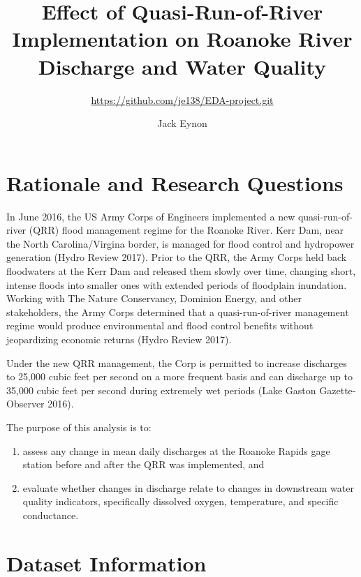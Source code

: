 \documentclass[12pt,]{article}
\title{Effect of Quasi-Run-of-River Implementation on Roanoke River Discharge
and Water Quality}
\subtitle{\url{https://github.com/je138/EDA-project.git}}
\author{Jack Eynon}
\date{}
\begin{document}
\maketitle

\newpage
\tableofcontents 
\newpage
\listoftables 
\newpage
\listoffigures 
\newpage

\hypertarget{rationale-and-research-questions}{%
\section{Rationale and Research
Questions}\label{rationale-and-research-questions}}

In June 2016, the US Army Corps of Engineers implemented a new
quasi-run-of-river (QRR) flood management regime for the Roanoke River.
Kerr Dam, near the North Carolina/Virgina border, is managed for flood
control and hydropower generation (Hydro Review 2017). Prior to the QRR,
the Army Corps held back floodwaters at the Kerr Dam and released them
slowly over time, changing short, intense floods into smaller ones with
extended periods of floodplain inundation. Working with The Nature
Conservancy, Dominion Energy, and other stakeholders, the Army Corps
determined that a quasi-run-of-river management regime would produce
environmental and flood control benefits without jeopardizing economic
returns (Hydro Review 2017).

Under the new QRR management, the Corp is permitted to increase
discharges to 25,000 cubic feet per second on a more frequent basis and
can discharge up to 35,000 cubic feet per second during extremely wet
periods (Lake Gaston Gazette-Observer 2016).

The purpose of this analysis is to:

\begin{enumerate}
\def\labelenumi{\arabic{enumi})}
\item
  assess any change in mean daily discharges at the Roanoke Rapids gage
  station before and after the QRR was implemented, and
\item
  evaluate whether changes in discharge relate to changes in downstream
  water quality indicators, specifically dissolved oxygen, temperature,
  and specific conductance.
\end{enumerate}

\newpage

\hypertarget{dataset-information}{%
\section{Dataset Information}\label{dataset-information}}
\end{document}
